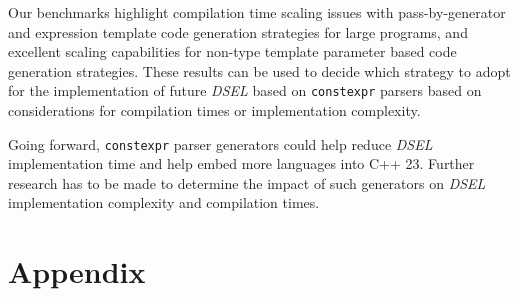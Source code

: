 \documentclass[english,12pt,a4paper]{book}
\providecommand{\constexpr}{\lstinline{constexpr}\xspace}
\providecommand{\cpp}{\textsc{C++}\xspace}
\providecommand{\dsel}{\textit{DSEL}\xspace}
\begin{document}
Our benchmarks highlight compilation time scaling issues with pass-by-generator
and expression template code generation strategies for large programs, and
excellent scaling capabilities for non-type template parameter based code
generation strategies. These results can be used to decide which strategy to
adopt for the implementation of future \dsel based on \constexpr parsers
based on considerations for compilation times or implementation complexity.

Going forward, \constexpr parser generators could help reduce
\dsel implementation time and help embed more languages into \cpp23.
Further research has to be made to determine the impact of such generators on
\dsel implementation complexity and compilation times.



\printbibliography

\chapter{Appendix}

\appendix


\end{document}
